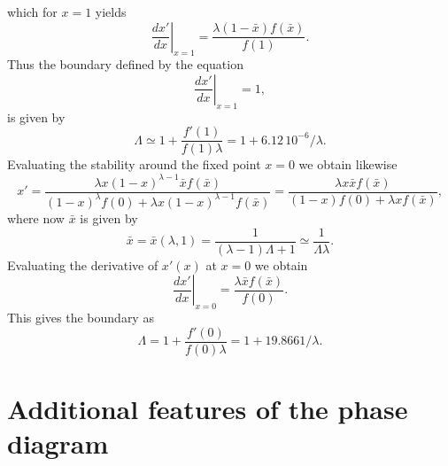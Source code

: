 \documentclass[twocolumn,showpacs,floatfix]{revtex4-1}
\newcommand{\xb}{{\bar x}}
\begin{document}
\begin{thebibliography}{99}
\begin{widetext}
\begin{equation}
\end{equation}
which for $x=1$ yields
\begin{equation}
\left.\frac{d x'}{d x}\right|_{x=1}=\frac{\lambda(1-\xb)f(\xb)}{f(1)}.
\end{equation}
Thus the boundary defined by the equation
\begin{equation}
\left.\frac{d x'}{d x}\right|_{x=1}=1,
\end{equation}
is given by
\begin{equation}
\Lambda \simeq 1+\frac{f'(1)}{f(1)\lambda}=1+6.12\, 10^{-6}/\lambda.
\end{equation}
Evaluating the stability around the fixed point $x=0$ we obtain likewise
\begin{equation}
x'=\frac{\lambda x (1-x)^{\lambda-1}\xb f(\xb)}{(1-x)^{\lambda}f(0)+\lambda x (1-x)^{\lambda-1} f(\xb)}=\frac{\lambda x \xb f(\xb)}{(1-x)f(0)+\lambda x f(\xb) },
\end{equation}
where now $\xb$ is given by
\begin{equation}
\xb=\xb(\lambda,1)=\frac{1}{(\lambda-1)\Lambda+1}\simeq \frac{1}{\Lambda\lambda}.
\end{equation}
Evaluating the derivative of $x'(x)$ at $x=0$ we obtain
\begin{equation}
\left.\frac{d x'}{d x}\right|_{x=0}=\frac{\lambda \xb f(\xb)}{f(0)}.
\end{equation}
This gives the boundary as
\begin{equation}
\Lambda=1+\frac{f'(0)}{f(0)\lambda}=1+19.8661/\lambda.
\end{equation}


\section{Additional features of the phase diagram}


\end{widetext}
\end{thebibliography}
\end{document}
